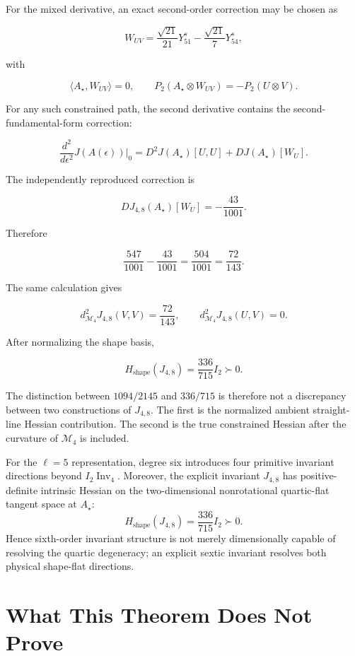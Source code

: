 For the mixed derivative, an exact second-order correction may be chosen as

\[
W_{UV}=\frac{\sqrt{21}}{21}Y^s_{51}-\frac{\sqrt{21}}7Y^s_{54},
\]

with

\[
\langle A_\star,W_{UV}\rangle=0,
\qquad
P_2(A_\star\otimes W_{UV})=-P_2(U\otimes V).
\]

For any such constrained path, the second derivative contains the second-fundamental-form correction:

\[
\boxed{
\frac{d^2}{d\epsilon^2}J(A(\epsilon))\Big|_{0}
=D^2J(A_\star)[U,U]+DJ(A_\star)[W_U].
}
\]

The independently reproduced correction is

\[
DJ_{4,8}(A_\star)[W_U]=-\frac{43}{1001}.
\]

Therefore

\[
\frac{547}{1001}-\frac{43}{1001}
=\frac{504}{1001}
=\boxed{\frac{72}{143}}.
\]

The same calculation gives

\[
d^2_{\mathcal M_4}J_{4,8}(V,V)=\frac{72}{143},
\qquad
d^2_{\mathcal M_4}J_{4,8}(U,V)=0.
\]

After normalizing the shape basis,

\[
\boxed{
H_{\mathrm{shape}}(J_{4,8})
=\frac{336}{715}I_2\succ0.
}
\]

The distinction between $1094/2145$ and $336/715$ is therefore not a discrepancy between two constructions of $J_{4,8}$. The first is the normalized ambient straight-line Hessian contribution. The second is the true constrained Hessian after the curvature of $\mathcal M_4$ is included.

\begin{theorem}
For the $\ell=5$ representation, degree six introduces four primitive invariant directions beyond $I_2\operatorname{Inv}_4$. Moreover, the explicit invariant $J_{4,8}$ has positive-definite intrinsic Hessian on the two-dimensional nonrotational quartic-flat tangent space at $A_\star$:
\[
H_{\mathrm{shape}}(J_{4,8})=\frac{336}{715}I_2\succ0.
\]
Hence sixth-order invariant structure is not merely dimensionally capable of resolving the quartic degeneracy; an explicit sextic invariant resolves both physical shape-flat directions.
\end{theorem}

\section{What This Theorem Does Not Prove}

